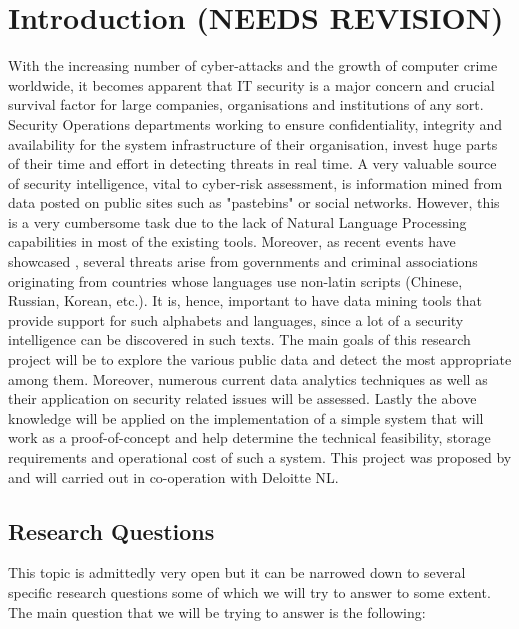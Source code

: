 \documentclass[12pt]{article}
\begin{document}
\newpage

\tableofcontents
\newpage

\section{Introduction (NEEDS REVISION)}
\parbox{\linewidth}{
With the increasing number of cyber-attacks and the growth of computer crime worldwide, it becomes apparent that IT security is a major concern and crucial survival factor for large companies, organisations and institutions of any sort. Security Operations departments working to ensure confidentiality, integrity and availability for the system infrastructure of their organisation, invest huge  parts \cite{cyber} of their time and effort in detecting threats in real time. A very valuable source of security intelligence, vital to cyber-risk assessment, is information mined from data posted on public sites such as "pastebins" or social networks. However, this is a very cumbersome task due to the lack of Natural Language Processing capabilities in most of the existing tools. Moreover, as recent events have showcased \cite{sony}, several threats arise from governments and criminal associations originating from countries whose languages use non-latin scripts (Chinese, Russian, Korean, etc.). It is, hence, important to have data mining tools that provide support for such alphabets and languages, since a lot of a security intelligence can be discovered in such texts. The main goals of this research project will be to explore the various public data and detect the most appropriate among them. Moreover, numerous current data analytics techniques as well as their application on security related issues will be assessed. Lastly the above knowledge will be applied on the implementation of a simple system that will work as a proof-of-concept and help determine the technical feasibility, storage requirements and operational cost of such a system. This project was proposed by and will carried out in co-operation with Deloitte NL. 
}
\newpage
\subsection{Research Questions}
This topic is admittedly very open but it can be narrowed down to several specific research questions some of which we will try to answer to some extent. The main question that we will be trying to answer is the following:\\[0.1cm]
\end{document}
